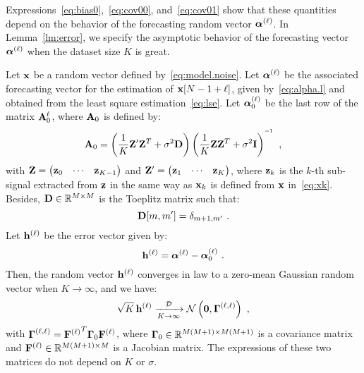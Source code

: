 Expressions~\eqref{eq:bias0},~\eqref{eq:cov00}, and~\eqref{eq:cov01} show that these quantities depend on the behavior of the forecasting random vector $\boldsymbol{\alpha}^{(\ell)}$. In Lemma~\ref{lm:error}, we specify the asymptotic behavior of the forecasting vector $\boldsymbol{\alpha}^{(\ell)}$ when the dataset size $K$ is great.
\begin{lemma}
\label{lm:error}
Let ${\mathbf x}$ be a random vector defined by~\eqref{eq:model.noise}. Let $\boldsymbol{\alpha}^{(\ell)}$ be the associated forecasting vector for the estimation of ${\mathbf x}[N-1+\ell]$, given by~\eqref{eq:alpha.l} and obtained from the least square estimation~\eqref{eq:lse}. Let $\boldsymbol{\alpha}_0^{(\ell)}$ be the last row of the matrix ${\mathbf A}_0^\ell$, where ${\mathbf A}_0$ is defined by:
\begin{equation}
\bA_0 = \left(\dfrac1K\bZ'\bZ^T+\sigma^2\bD\right)\left(\dfrac1K\bZ\bZ^T+\sigma^2\bI\right)^{\inv}\ ,
\label{eq:lse.0}
\end{equation}
with ${\mathbf Z}=\begin{pmatrix} {\mathbf z}_0 & \cdots & {\mathbf z}_{K-1}\end{pmatrix}$ and ${\mathbf Z}'=\begin{pmatrix} {\mathbf z}_1 & \cdots & {\mathbf z}_{K}\end{pmatrix}$, where ${\mathbf z}_k$ is the $k$-th sub-signal extracted from ${\mathbf z}$ in the same way as ${\mathbf x}_k$ is defined from ${\mathbf x}$ in~\eqref{eq:xk}. Besides, ${\mathbf D}\in{\mathbb R}^{M\times M}$ is the Toeplitz matrix such that:
\[
{\mathbf D}[m,m'] = \delta_{m+1,m'}\ .
\]
Let ${\mathbf h}^{(\ell)}$ be the error vector given by:
\begin{equation*}
{\mathbf h}^{(\ell)} = \boldsymbol{\alpha}^{(\ell)} - \boldsymbol{\alpha}_0^{(\ell)}\ .
\end{equation*}
Then, the random vector ${\mathbf h}^{(\ell)}$ converges in law to a zero-mean Gaussian random vector when $K\to\infty$, and we have:
\begin{equation}
\sqrt{K}\,{\mathbf h}^{(\ell)}  \xrightarrow[K\to\infty]{{\mathcal D}} {\mathcal N}\left(\boldsymbol{0},\boldsymbol{\Gamma}^{(\ell,\ell)}\right)\ ,
\end{equation}
with $\boldsymbol{\Gamma}^{(\ell,\ell)}={{\mathbf F}^{(\ell)}}^T\boldsymbol{\Gamma}_0{\mathbf F}^{(\ell)}$, where $\boldsymbol{\Gamma}_0\in{\mathbb R}^{M(M+1)\times M(M+1)}$ is a covariance matrix and ${\mathbf F}^{(\ell)}\in{\mathbb R}^{M(M+1)\times M}$ is a Jacobian matrix. The expressions of these two matrices do not depend on $K$ or $\sigma$. 
\end{lemma}

